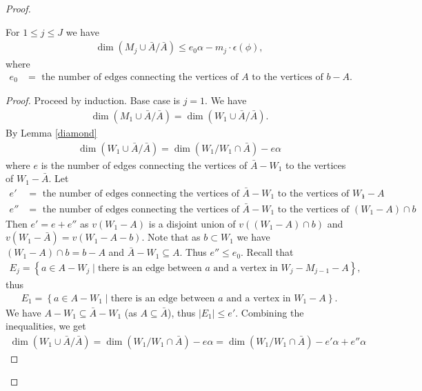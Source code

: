 \documentclass{amsart}
\newcommand{\BA}{\bar A}
\newcommand{\curly}[1]{\left\{#1\right\}}
\begin{document}
\begin{proof}
  \begin{Lemma} \label{ubdim_lemma}
    For $1 \leq j \leq J$ we have
    \begin{align*}
      \dim(M_j \cup \BA / \BA) \leq e_0 \alpha - m_j \cdot \epsilon(\phi),
    \end{align*}
    where
    \begin{align*}
      e_0 &= \text{ the number of edges connecting the vertices of $A$ to the vertices of $b - A$}.
    \end{align*}
  \end{Lemma}
  \begin{proof}
    Proceed by induction. Base case is $j = 1$.
    We have
    \begin{align*}
      \dim(M_1 \cup \BA / \BA) = \dim(W_1 \cup \BA / \BA).
    \end{align*}
    By Lemma \ref{diamond}
    \begin{align*}
      \dim(W_1 \cup \BA / \BA) = \dim(W_1 / W_1 \cap \BA) - e \alpha
    \end{align*}
    where $e$ is the number of edges connecting the vertices of $\BA - W_1$ to the vertices of $W_1 - \BA$.
    Let 
    \begin{align*}
      e'  &= \text{ the number of edges connecting the vertices of $\BA - W_1$ to the vertices of $W_1 - A$}, \\
      e'' &= \text{ the number of edges connecting the vertices of $\BA - W_1$ to the vertices of $(W_1 - A) \cap b$}.
    \end{align*}
    Then $e' = e + e''$ as $v(W_1 - A)$ is a disjoint union of $v((W_1 - A) \cap b)$ and $v(W_1 - \BA) = v(W_1 - A - b)$.
    Note that as $b \subset W_1$ we have $(W_1 - A) \cap b = b - A$ and $\BA - W_1 \subseteq A$.
    Thus $e'' \leq e_0$.
    Recall that 
    \begin{align*}
      E_j = \curly{a \in A - W_j \mid \text{there is an edge between $a$ and a vertex in $W_j - M_{j-1} - A$}},
    \end{align*}
    thus
    \begin{align*}
      E_1 = \curly{a \in A - W_1 \mid \text{there is an edge between $a$ and a vertex in $W_1 - A$}}.
    \end{align*}
    We have $A - W_1 \subseteq \BA - W_1$ (as $A \subseteq \BA$), thus $|E_1| \leq e'$.
    Combining the inequalities, we get
    \begin{align*}
      \dim(W_1 \cup \BA / \BA) = \dim(W_1 / W_1 \cap \BA) - e \alpha = \dim(W_1 / W_1 \cap \BA) - e' \alpha + e'' \alpha

\end{align*}
\end{proof}
\end{proof}
\end{document}

